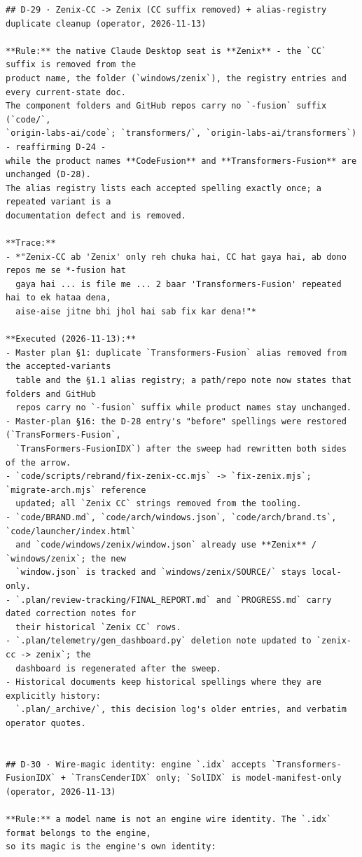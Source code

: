 \begin{verbatim}
## D-29 · Zenix-CC -> Zenix (CC suffix removed) + alias-registry duplicate cleanup (operator, 2026-11-13)

**Rule:** the native Claude Desktop seat is **Zenix** - the `CC` suffix is removed from the
product name, the folder (`windows/zenix`), the registry entries and every current-state doc.
The component folders and GitHub repos carry no `-fusion` suffix (`code/`,
`origin-labs-ai/code`; `transformers/`, `origin-labs-ai/transformers`) - reaffirming D-24 -
while the product names **CodeFusion** and **Transformers-Fusion** are unchanged (D-28).
The alias registry lists each accepted spelling exactly once; a repeated variant is a
documentation defect and is removed.

**Trace:**
- *"Zenix-CC ab 'Zenix' only reh chuka hai, CC hat gaya hai, ab dono repos me se *-fusion hat
  gaya hai ... is file me ... 2 baar 'Transformers-Fusion' repeated hai to ek hataa dena,
  aise-aise jitne bhi jhol hai sab fix kar dena!"*

**Executed (2026-11-13):**
- Master plan §1: duplicate `Transformers-Fusion` alias removed from the accepted-variants
  table and the §1.1 alias registry; a path/repo note now states that folders and GitHub
  repos carry no `-fusion` suffix while product names stay unchanged.
- Master-plan §16: the D-28 entry's "before" spellings were restored (`TransFormers-Fusion`,
  `TransFormers-FusionIDX`) after the sweep had rewritten both sides of the arrow.
- `code/scripts/rebrand/fix-zenix-cc.mjs` -> `fix-zenix.mjs`; `migrate-arch.mjs` reference
  updated; all `Zenix CC` strings removed from the tooling.
- `code/BRAND.md`, `code/arch/windows.json`, `code/arch/brand.ts`, `code/launcher/index.html`
  and `code/windows/zenix/window.json` already use **Zenix** / `windows/zenix`; the new
  `window.json` is tracked and `windows/zenix/SOURCE/` stays local-only.
- `.plan/review-tracking/FINAL_REPORT.md` and `PROGRESS.md` carry dated correction notes for
  their historical `Zenix CC` rows.
- `.plan/telemetry/gen_dashboard.py` deletion note updated to `zenix-cc -> zenix`; the
  dashboard is regenerated after the sweep.
- Historical documents keep historical spellings where they are explicitly history:
  `.plan/_archive/`, this decision log's older entries, and verbatim operator quotes.


## D-30 · Wire-magic identity: engine `.idx` accepts `Transformers-FusionIDX` + `TransCenderIDX` only; `SolIDX` is model-manifest-only (operator, 2026-11-13)

**Rule:** a model name is not an engine wire identity. The `.idx` format belongs to the engine,
so its magic is the engine's own identity:


\end{verbatim}
